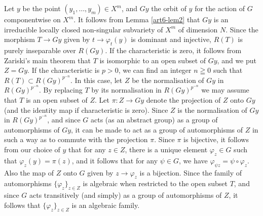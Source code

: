 Let $y$ be the point $(y_1, \ldots, y_m) \in X^m$, and $Gy$ the orbit of $y$ for the action of $G$ componentwise on $X^m$. It follows from Lemma \ref{art6-lem2} that $Gy$ is an irreducible locally closed non-singular subvariety of $X^m$ of dimension $N$. Since the morphism $T \to G y$ given by $t \to \varphi_t (y)$ is dominant and injective, $R (T)$ is purely inseparable over $R (Gy)$. If the characteristic is zero, it follows from Zariski's main theorem that $T$ is isomorphic to an open subset of $Gy$, and we put $Z = Gy$. If the characteristic is $p>0$, we can find an integer $n \geqq 0$ such that $R(T) \subset R (Gy)^{p^{-n}}$. In this case, let $Z$ be the normalisation of $Gy$ in $R (Gy)^{p^{-n}}$. By replacing $T$ by its normalisation in $R (Gy)^{p^{-n}}$ we may assume that $T$ is an open subset of $Z$. Let $\pi: Z \to G y$ denote the projection of $Z$ onto $Gy$ (and the identity map if characteristic is zero). Since $Z$ is the normalisation of $Gy$ in $R (Gy)^{p^{-n}}$, and since $G$ acts (as an abstract group) as a group of automorphisms of $Gy$, it can be made to act as a group of automorphisms of $Z$ in such a way as to commute with the projection $\pi$. Since $\pi$ is bijective, it follows from our choice of $y$ that for any $z \in Z$, there is a unique element $\varphi_z \in G$ such that $\varphi_z (y) = \pi (z)$, and it follows that for any $\psi \in G$, we have $\varphi_{\psi z} = \psi \circ \varphi_z$. Also the map of $Z$ onto $G$ given by $z \to \varphi_z$ is a bijection. Since the family of automorphisms $\{\varphi_z\}_{z \in Z}$ is algebraic when restricted to the open subset $T$, and  since $G$ acts transitively (and simply) as a group of automorphisms of $Z$, it follows that $\{\varphi_z\}_{z \in Z}$ is an algebraic family.

